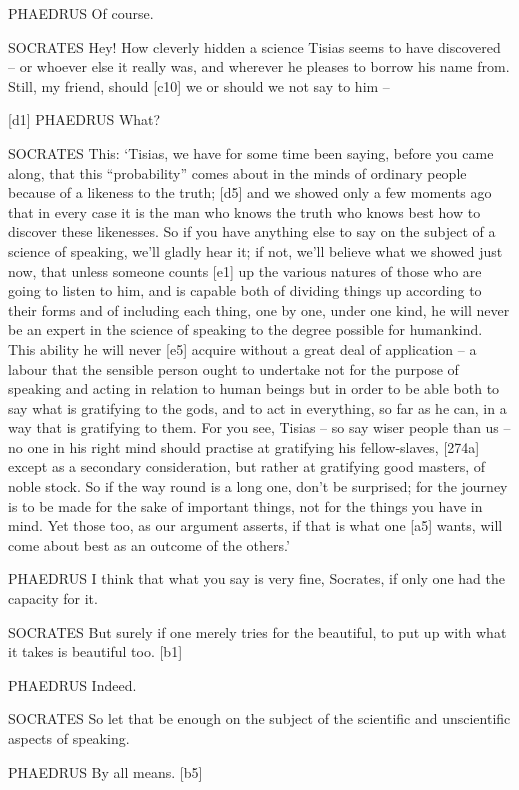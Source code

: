 PHAEDRUS Of course.

SOCRATES Hey! How cleverly hidden a science Tisias seems to have
discovered -- or whoever else it really was, and wherever he pleases to
borrow his name from.
Still, my friend, should {[}c10{]} we or should we not say to him --

{[}d1{]} PHAEDRUS What?

SOCRATES This: ‘Tisias, we have for some time been saying, before you
came along, that this “probability” comes about in the minds of ordinary
people because of a likeness to the truth; {[}d5{]} and we showed only a
few moments ago that in every case it is the man who knows the truth who
knows best how to discover these likenesses. So if you have anything
else to say on the subject of a science of speaking, we'll gladly hear
it; if not, we'll believe what we showed just now, that unless someone
counts {[}e1{]} up the various natures of those who are going to listen
to him, and is capable both of dividing
things up according to
their forms and of including each thing, one by one, under one kind, he
will never be an expert in the science of speaking to the degree
possible for humankind. This ability he will never {[}e5{]} acquire
without a great deal of application -- a labour that the sensible person
ought to undertake not for the purpose of speaking and acting in
relation to human beings but in order to be able both to say what is
gratifying to the gods,
and to act in everything, so far as he can, in a way that is gratifying
to them. For you see, Tisias -- so say wiser people than us -- no one in
his right mind should practise at gratifying his fellow-slaves,
{[}274a{]} except as a secondary consideration, but rather at gratifying
good masters, of noble
stock. So if the way
round is a long one, don't be surprised; for the journey is to be made
for the sake of important things, not for the things you have in mind.
Yet those too, as our argument asserts, if that is what one {[}a5{]}
wants, will come about best as an outcome of the
others.'

PHAEDRUS I think that what you say is very fine, Socrates, if only one
had the capacity for it.

SOCRATES But surely if one merely tries for the
beautiful, to put up
with what it takes is beautiful too. {[}b1{]}

PHAEDRUS Indeed.

SOCRATES So let that be enough on the subject of the scientific and
unscientific aspects of speaking.

PHAEDRUS By all means. {[}b5{]}

